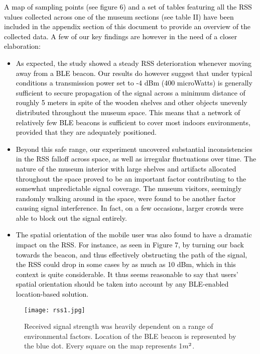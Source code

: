 \documentclass[prodmode,acmtomm]{acmsmall}
\begin{document}
\textcolor{black}{A map of sampling points (see figure 6) and a set of tables featuring all the RSS values collected across one of the museum sections (see table II) have been included in the appendix section of this document to provide an overview of the collected data. A few of our key findings are however in the need of a closer elaboration:}
\textcolor{black}{
\begin{itemize}
  \item As expected, the study showed a steady RSS deterioration whenever moving away from a BLE beacon. Our results do however suggest that under typical conditions a transmission power set to -4 dBm (400 microWatts) is generally sufficient to secure propagation of the signal across a minimum distance of roughly 5 meters in spite of the wooden shelves and other objects unevenly distributed throughout the museum space. This means that a network of relatively few BLE beacons is sufficient to cover most indoors environments, provided that they are adequately positioned. 
\item Beyond this safe range, our experiment uncovered substantial inconsistencies in the RSS falloff across space, as well as irregular fluctuations over time. The nature of the museum interior with large shelves and artifacts allocated throughout the space proved to be an important factor contributing to the somewhat unpredictable signal coverage. The museum visitors, seemingly randomly walking around in the space, were found to be another factor causing signal interference. In fact, on a  few occasions, larger crowds were able to block out the signal entirely. 
  \item The spatial orientation of the mobile user was also found to have a dramatic impact on the RSS. For instance, as seen in Figure 7, by turning our back towards the beacon, and thus effectively obstructing the path of the signal, the RSS could drop in some cases by as much as 10 dBm, which in this context is quite considerable. It thus seems reasonable to say that users' spatial orientation should be taken into account by any BLE-enabled location-based solution. 
\end{itemize}
} 

\begin{figure}[h!]
\begin{center}
\texttt{[image: rss1.jpg]}
\caption{Received signal strength was heavily dependent on a range of environmental factors. Location of the BLE beacon is represented by the blue dot. Every square on the map represents 1$m\textsuperscript{2}$.}
\end{center}
\vspace{-10pt}
\end{figure}
\end{document}
